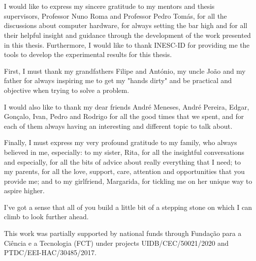 
\section*{\acknowledgments}


I would like to express my sincere gratitude to my mentors and thesis supervisors, Professor Nuno Roma and Professor Pedro Tomás, for all the discussions about computer hardware, for always setting the bar high and for all their helpful insight and guidance through the development of the work presented in this thesis. Furthermore, I would like to thank INESC-ID for providing me the tools to develop the experimental results for this thesis.

First, I must thank my grandfathers Filipe and António, my uncle João and my father for always inspiring me to get my "hands dirty" and be practical and objective when trying to solve a problem.

I would also like to thank my dear friends André Meneses, André Pereira, Edgar, Gonçalo, Ivan, Pedro and Rodrigo for all the good times that we spent, and for each of them always having an interesting and different topic to talk about.

Finally, I must express my very profound gratitude to my family, who always believed in me, especially: 
to my sister, Rita, for all the insightful conversations and especially, for all the bits of advice about really everything that I need;
to my parents, for all the love, support, care, attention and opportunities that you provide me;
and to my girlfriend, Margarida, for tickling me on her unique way to aspire higher.

I've got a sense that all of you build a little bit of a stepping stone on which I can climb to look further ahead.

This work was partially supported by national funds through
Fundação para a Ciência e a Tecnologia (FCT) under projects
UIDB/CEC/50021/2020 and PTDC/EEI-HAC/30485/2017.

